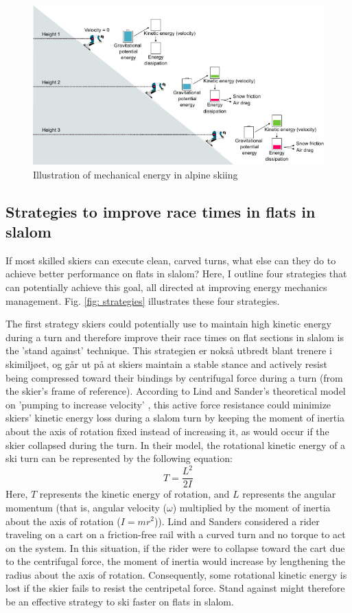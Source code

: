 \begin{figure}[H]
    \centering
    \includegraphics[width=1\linewidth]{figure/figure_introduction_mechenergy3.pdf}
    \caption{Illustration of mechanical energy in alpine skiing}
    \label{fig: energy}
\end{figure}



\subsection{Strategies to improve race times in flats in slalom}\label{introduction: strategies}
If most skilled skiers can execute clean, carved turns, what else can they do to achieve better performance on flats in slalom? Here, I outline four strategies that can potentially achieve this goal, all directed at improving energy mechanics management.  Fig. \ref{fig: strategies} illustrates these four strategies.  

The first strategy skiers could potentially use to maintain high kinetic energy during a turn and therefore improve their race times on flat sections in slalom is the 'stand against' technique. This strategien er nokså utbredt blant trenere i skimiljøet, og går ut på at skiers maintain a stable stance and actively resist being compressed toward their bindings by centrifugal force during a turn (from the skier's frame of reference). According to Lind and Sander's theoretical model on 'pumping to increase velocity' \cite{lind_physics_2004}, this active force resistance could minimize skiers' kinetic energy loss during a slalom turn by keeping the moment of inertia about the axis of rotation fixed instead of increasing it, as would occur if the skier collapsed during the turn. In their model, the rotational kinetic energy of a ski turn can be represented by the following equation: 
\[ T = \frac{L^2}{2I} \]
Here, $T$ represents the kinetic energy of rotation, and $L$ represents the angular momentum (that is, angular velocity ($\omega$) multiplied by the moment of inertia about the axis of rotation ($I = mr^2$)). Lind and Sanders considered a rider traveling on a cart on a friction-free rail with a curved turn and no torque to act on the system. In this situation, if the rider were to collapse toward the cart due to the centrifugal force, the moment of inertia would increase by lengthening the radius about the axis of rotation. Consequently, some rotational kinetic energy is lost if the skier fails to resist the centripetal force. Stand against might therefore be an effective strategy to ski faster on flats in slalom.  


